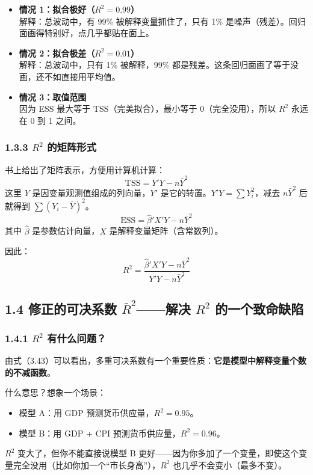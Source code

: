 \documentclass[12pt,a4paper]{ctexart}
\begin{document}
\begin{itemize}
    \item \textbf{情况 1：拟合极好（\(R^2 = 0.99\)）}\\
    解释：总波动中，有 99\% 被解释变量抓住了，只有 1\% 是噪声（残差）。回归面画得特别好，点几乎都贴在面上。
    \item \textbf{情况 2：拟合极差（\(R^2 = 0.01\)）}\\
    解释：总波动中，只有 1\% 被解释，99\% 都是残差。这条回归面画了等于没画，还不如直接用平均值。
    \item \textbf{情况 3：取值范围}\\
    因为 ESS 最大等于 TSS（完美拟合），最小等于 0（完全没用），所以 \(R^2\) 永远在 0 到 1 之间。
\end{itemize}

\subsubsection{1.3.3 \(R^2\) 的矩阵形式}

书上给出了矩阵表示，方便用计算机计算：
\begin{equation}
\text{TSS} = Y'Y - n\bar{Y}^2 \tag{3.41}
\end{equation}
这里 \(Y\) 是因变量观测值组成的列向量，\(Y'\) 是它的转置。\(Y'Y = \sum Y_i^2\)，减去 \(n\bar{Y}^2\) 后就得到 \(\sum(Y_i - \bar{Y})^2\)。
\begin{equation}
\text{ESS} = \hat{\beta}'X'Y - n\bar{Y}^2 \tag{3.42}
\end{equation}
其中 \(\hat{\beta}\) 是参数估计向量，\(X\) 是解释变量矩阵（含常数列）。

因此：
\begin{equation}
R^2 = \frac{\hat{\beta}'X'Y - n\bar{Y}^2}{Y'Y - n\bar{Y}^2} \tag{3.43}
\end{equation}

\subsection{1.4 修正的可决系数 \(\bar{R}^2\)——解决 \(R^2\) 的一个致命缺陷}

\subsubsection{1.4.1 \(R^2\) 有什么问题？}

由式（3.43）可以看出，多重可决系数有一个重要性质：\textbf{它是模型中解释变量个数的不减函数}。

什么意思？想象一个场景：
\begin{itemize}
    \item 模型 A：用 GDP 预测货币供应量，\(R^2 = 0.95\)。
    \item 模型 B：用 GDP + CPI 预测货币供应量，\(R^2 = 0.96\)。
\end{itemize}
\(R^2\) 变大了，但你不能直接说模型 B 更好——因为你多加了一个变量，即使这个变量完全没用（比如你加一个“市长身高”），\(R^2\) 也几乎不会变小（最多不变）。
\end{document}
